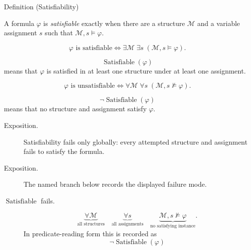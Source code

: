 \begin{definitionbox}{Definition (Satisfiability)}
\begin{definition}[Satisfiability]
\label{def:fol-satisfiability}
A formula \(\varphi\) is \emph{satisfiable} exactly when there are a structure
\(\mathcal M\) and a variable assignment \(s\) such that
\(\mathcal M,s\models\varphi\).
\end{definition}
\end{definitionbox}

\begin{remark*}
\[
\varphi \text{ is satisfiable}
\Longleftrightarrow
\exists \mathcal M\;\exists s\;(\mathcal M,s\models\varphi).
\]
\end{remark*}

\begin{remark*}
\[
  \operatorname{Satisfiable}(\varphi)
\] means that \(\varphi\) is
satisfied in at least one structure under at least one assignment.
\end{remark*}

\begin{remark*}
\[
\varphi \text{ is unsatisfiable}
\Longleftrightarrow
\forall \mathcal M\;\forall s\;(\mathcal M,s\not\models\varphi).
\]
\end{remark*}

\begin{remark*}
\[
  \neg\operatorname{Satisfiable}(\varphi)
\] means that no structure and
assignment satisfy \(\varphi\).
\end{remark*}

\begin{remark*}
\begin{description}
  \item[Exposition.] Satisfiability fails only globally: every attempted structure and assignment
fails to satisfy the formula.
\end{description}
\end{remark*}

\begin{remark*}
\begin{description}
  \item[Exposition.] The named branch below records the displayed failure mode.
\item[\(\operatorname{Satisfiable}\) fails.] \[
\underbrace{\forall \mathcal M}_{\text{all structures}}
\quad
\underbrace{\forall s}_{\text{all assignments}}
\quad
\underbrace{\mathcal M,s\not\models\varphi}_{\text{no satisfying instance}}.
\]
  In predicate-reading form this is recorded as
  \[
    \neg\operatorname{Satisfiable}(\varphi)
  \]
\end{description}
\end{remark*}

